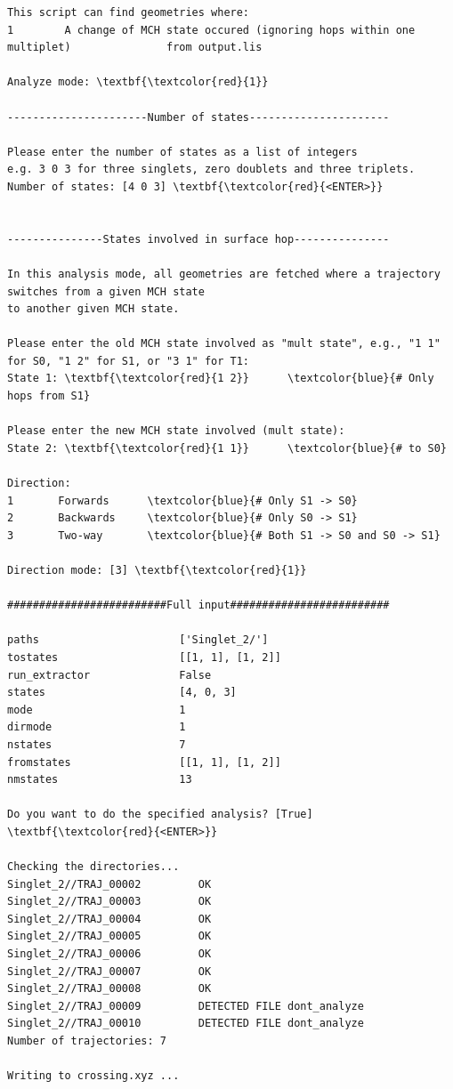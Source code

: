 \documentclass[a4paper,11pt,DIV=15,openany]{scrbook}
\begin{document}
\begin{oframed}
\begin{Verbatim}[commandchars=\\\{\}]
This script can find geometries where:
1        A change of MCH state occured (ignoring hops within one multiplet)               from output.lis

Analyze mode: \textbf{\textcolor{red}{1}}

----------------------Number of states----------------------

Please enter the number of states as a list of integers
e.g. 3 0 3 for three singlets, zero doublets and three triplets.
Number of states: [4 0 3] \textbf{\textcolor{red}{<ENTER>}}


---------------States involved in surface hop---------------

In this analysis mode, all geometries are fetched where a trajectory switches from a given MCH state
to another given MCH state.

Please enter the old MCH state involved as "mult state", e.g., "1 1" for S0, "1 2" for S1, or "3 1" for T1:
State 1: \textbf{\textcolor{red}{1 2}}      \textcolor{blue}{# Only hops from S1}

Please enter the new MCH state involved (mult state):
State 2: \textbf{\textcolor{red}{1 1}}      \textcolor{blue}{# to S0}

Direction:
1       Forwards      \textcolor{blue}{# Only S1 -> S0}
2       Backwards     \textcolor{blue}{# Only S0 -> S1}
3       Two-way       \textcolor{blue}{# Both S1 -> S0 and S0 -> S1}

Direction mode: [3] \textbf{\textcolor{red}{1}}

#########################Full input#########################

paths                      ['Singlet_2/']
tostates                   [[1, 1], [1, 2]]
run_extractor              False
states                     [4, 0, 3]
mode                       1
dirmode                    1
nstates                    7
fromstates                 [[1, 1], [1, 2]]
nmstates                   13

Do you want to do the specified analysis? [True] \textbf{\textcolor{red}{<ENTER>}}

Checking the directories...
Singlet_2//TRAJ_00002         OK
Singlet_2//TRAJ_00003         OK
Singlet_2//TRAJ_00004         OK
Singlet_2//TRAJ_00005         OK
Singlet_2//TRAJ_00006         OK
Singlet_2//TRAJ_00007         OK
Singlet_2//TRAJ_00008         OK
Singlet_2//TRAJ_00009         DETECTED FILE dont_analyze
Singlet_2//TRAJ_00010         DETECTED FILE dont_analyze
Number of trajectories: 7

Writing to crossing.xyz ...
\end{Verbatim}
\end{oframed}
\end{document}
